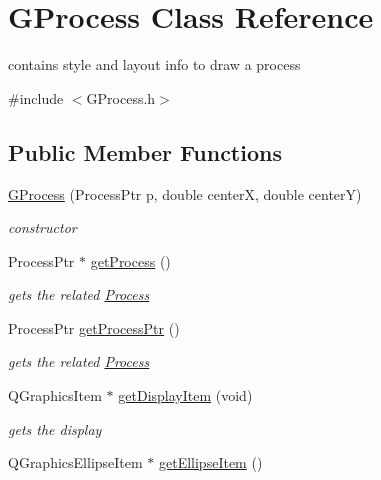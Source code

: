 \hypertarget{classGProcess}{\section{G\+Process Class Reference}
\label{classGProcess}
}


contains style and layout info to draw a process  




{\ttfamily \#include $<$G\+Process.\+h$>$}

\subsection*{Public Member Functions}
\begin{DoxyCompactItemize}
\item 
\hyperlink{classGProcess_a9d2c574670ad8ba93aa174b65e403d88}{G\+Process} (Process\+Ptr p, double center\+X, double center\+Y)
\begin{DoxyCompactList}\small\item\em constructor \end{DoxyCompactList}\item 
\hypertarget{classGProcess_ad35cae9e80b72eb324ea6372eaf03f61}{Process\+Ptr $\ast$ \hyperlink{classGProcess_ad35cae9e80b72eb324ea6372eaf03f61}{get\+Process} ()}\label{classGProcess_ad35cae9e80b72eb324ea6372eaf03f61}

\begin{DoxyCompactList}\small\item\em gets the related \hyperlink{classProcess}{Process} \end{DoxyCompactList}\item 
\hypertarget{classGProcess_acff384353cc5b80c04d360d1ff4cbe93}{Process\+Ptr \hyperlink{classGProcess_acff384353cc5b80c04d360d1ff4cbe93}{get\+Process\+Ptr} ()}\label{classGProcess_acff384353cc5b80c04d360d1ff4cbe93}

\begin{DoxyCompactList}\small\item\em gets the related \hyperlink{classProcess}{Process} \end{DoxyCompactList}\item 
Q\+Graphics\+Item $\ast$ \hyperlink{classGProcess_a2f1e6d738a87a2c9330f514029c97659}{get\+Display\+Item} (void)
\begin{DoxyCompactList}\small\item\em gets the display \end{DoxyCompactList}\item 
\hypertarget{classGProcess_ae1fa4f2cb33483789c87bd3f70a863c4}{Q\+Graphics\+Ellipse\+Item $\ast$ \hyperlink{classGProcess_ae1fa4f2cb33483789c87bd3f70a863c4}{get\+Ellipse\+Item} ()}\label{classGProcess_ae1fa4f2cb33483789c87bd3f70a863c4}


\end{DoxyCompactItemize}
